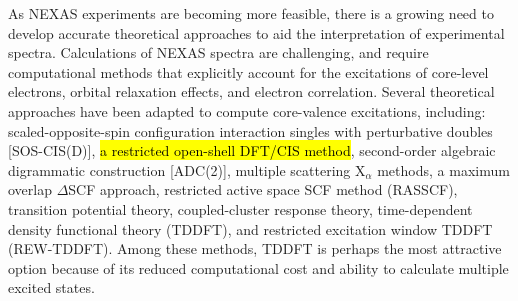 \documentclass[12pt]{article}
\begin{document}
As NEXAS experiments are becoming more feasible, there is a growing need to develop accurate theoretical approaches to aid the interpretation of experimental spectra.
Calculations of NEXAS spectra are challenging, and require computational methods that explicitly account for the excitations of core-level electrons, orbital relaxation effects, and electron correlation. \cite{coriani_coupled-cluster_2012} Several theoretical approaches have been adapted to compute core-valence excitations, including: scaled-opposite-spin configuration interaction singles with perturbative doubles [SOS-CIS(D)],\cite{asmuruf_calculation_2008} \hl{a restricted open-shell DFT/CIS method},\cite{roemelt_excited_2013,roemelt_combined_2013} second-order algebraic digrammatic construction [ADC(2)],\cite{schirmer_beyond_1982,trofimov_efficient_1995} multiple scattering X$_\alpha$ methods, \cite{sheehy_correlation_1989} a maximum overlap $\Delta$SCF approach, \cite{besley_self-consistent-field_2009} restricted active space SCF method (RASSCF), \cite{agren_relaxation_1993} transition potential theory,\cite{triguero_calculations_1998} coupled-cluster response theory, \cite{coriani_coupled-cluster_2012} time-dependent density functional theory (TDDFT),\cite{stener_time_2003} and restricted excitation window TDDFT (REW-TDDFT). \cite{lopata_linear-response_2012} Among these methods, TDDFT is perhaps the most attractive option because of its reduced computational cost and ability to calculate multiple excited states.
\end{document}
